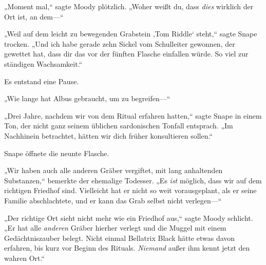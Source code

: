 „Moment mal,“ sagte Moody plötzlich. „Woher weißt du, dass \emph{dies} wirklich der Ort ist, an dem—“

„Weil auf dem leicht zu bewegenden Grabstein ‚Tom Riddle‘ steht,“ sagte Snape trocken. „Und ich habe gerade zehn Sickel vom Schulleiter gewonnen, der gewettet hat, dass dir das vor der fünften Flasche einfallen würde. So viel zur ständigen Wachsamkeit.“

Es entstand eine Pause.

„Wie lange hat Albus gebraucht, um zu begreifen—“

„Drei Jahre, nachdem wir von dem Ritual erfahren hatten,“ sagte Snape in einem Ton, der nicht ganz seinem üblichen sardonischen Tonfall entsprach. „Im Nachhinein betrachtet, hätten wir dich früher konsultieren sollen.“

Snape öffnete die neunte Flasche.

„Wir haben auch alle anderen Gräber vergiftet, mit lang anhaltenden Substanzen,“ bemerkte der ehemalige Todesser. „Es \emph{ist} möglich, dass wir auf dem richtigen Friedhof sind. Vielleicht hat er nicht so weit vorausgeplant, als er seine Familie abschlachtete, und er kann das Grab selbst nicht verlegen—“

„Der richtige Ort sieht nicht mehr wie ein Friedhof aus,“ sagte Moody schlicht. „Er hat alle \emph{anderen} Gräber hierher verlegt und die Muggel mit einem Gedächtniszauber belegt. Nicht einmal Bellatrix Black hätte etwas davon erfahren, bis kurz vor Beginn des Rituals. \emph{Niemand} außer ihm kennt jetzt den wahren Ort.“

